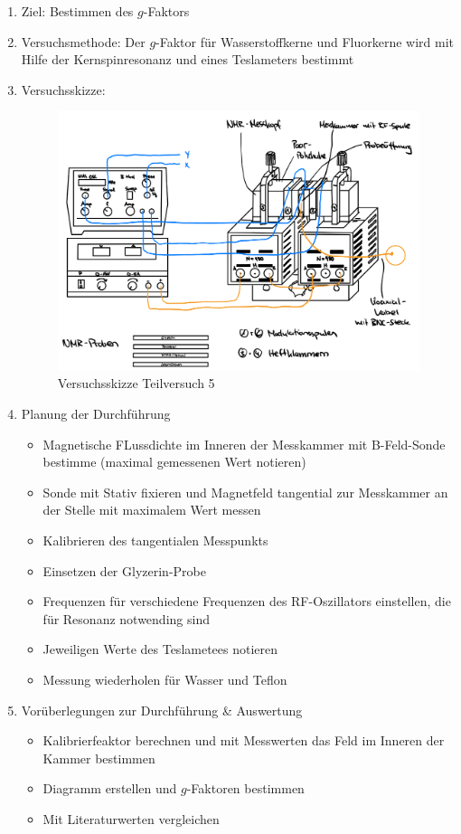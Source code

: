 \documentclass{article}
\begin{document}
\begin{enumerate}[label = (\Roman*)]
    \item Ziel: Bestimmen des $g$-Faktors
    
    \item Versuchsmethode: Der $g$-Faktor für Wasserstoffkerne und Fluorkerne wird mit Hilfe der Kernspinresonanz und eines Teslameters bestimmt
    
    \item Versuchsskizze:
    
        \begin{figure}[H]
        \centering
        \includegraphics[width=0.7\linewidth]{Abbildungen/TV1-5.jpeg}
        \caption{Versuchsskizze Teilversuch 5}
        \end{figure}

    \item Planung der Durchführung
        \begin{itemize}
           \item Magnetische FLussdichte im Inneren der Messkammer mit B-Feld-Sonde bestimme (maximal gemessenen Wert notieren)
           \item Sonde mit Stativ fixieren und Magnetfeld tangential zur Messkammer an der Stelle mit maximalem Wert messen
           \item Kalibrieren des tangentialen Messpunkts
           \item Einsetzen der Glyzerin-Probe
           \item Frequenzen für verschiedene Frequenzen des RF-Oszillators einstellen, die für Resonanz notwending sind
           \item Jeweiligen Werte des Teslametees notieren
           \item Messung wiederholen für Wasser und Teflon
        \end{itemize}

    \item Vorüberlegungen zur Durchführung \& Auswertung
        \begin{itemize}
            \item Kalibrierfeaktor berechnen und mit Messwerten das Feld im Inneren der Kammer bestimmen
            \item Diagramm erstellen und $g$-Faktoren bestimmen
            \item Mit Literaturwerten vergleichen
        \end{itemize}
        
\end{enumerate}
\end{document}

